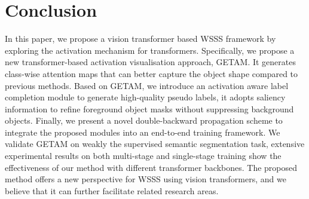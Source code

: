 \documentclass[10pt,twocolumn,letterpaper]{article}
\begin{document}
\section{Conclusion}
In this paper, we propose a vision transformer based WSSS framework by exploring the activation mechanism for transformers. 
Specifically, we propose a new transformer-based activation visualisation approach,  GETAM. It generates  class-wise attention maps that can better capture the object shape compared to previous methods. 
Based on GETAM, we introduce an activation aware label completion module to generate high-quality pseudo labels, it
adopts saliency information 
to refine foreground object masks 
without suppressing background objects.
Finally, we present a novel double-backward propagation scheme to integrate the proposed modules into an end-to-end training framework.
We validate GETAM on weakly the supervised semantic segmentation task,
extensive experimental results on both multi-stage and single-stage training show the effectiveness of our method with different transformer backbones. 
The proposed method offers a new perspective for WSSS using vision transformers,
and we believe that it can further facilitate related research areas.


{\small


}
\end{document}
